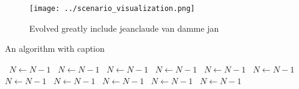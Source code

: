 \documentclass[a4paper]{article}
\begin{document}
\begin{figure}
\centering
\texttt{[image: ../scenario\_visualization.png]}
\caption{Evolved greatly include jeanclaude van damme jan 
}
\end{figure}
 
\begin{algorithm}
\caption{An algorithm with caption}
\begin{algorithmic}
\    \State $N \gets N - 1$
\    \State $N \gets N - 1$
\    \State $N \gets N - 1$
\    \State $N \gets N - 1$
\    \State $N \gets N - 1$
\    \State $N \gets N - 1$
\    \State $N \gets N - 1$
\    \State $N \gets N - 1$
\    \State $N \gets N - 1$
\    \State $N \gets N - 1$
\    \State $N \gets N - 1$
\EndWhile
\end{algorithmic}
\end{algorithm}
\end{document}
